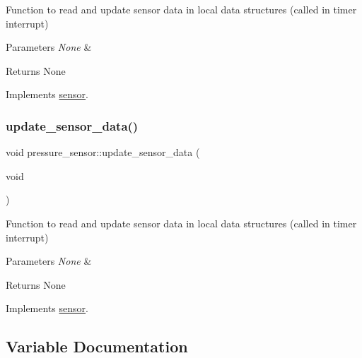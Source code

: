Function to read and update sensor data in local data structures (called in timer interrupt) 


\begin{DoxyParams}{Parameters}
{\em None} & \\
\hline
\end{DoxyParams}
\begin{DoxyReturn}{Returns}
None 
\end{DoxyReturn}


Implements \hyperlink{classsensor_a8a8cdbc1c82a4089bf0a70f980fb37d4}{sensor}.

\mbox{\label{group___ventilator_module_gac8d67444e99afbc866b1d759cbfde3c5}} 
\subsubsection{\texorpdfstring{update\+\_\+sensor\+\_\+data()}{update\_sensor\_data()}\hspace{0.1cm}{\footnotesize\ttfamily [2/2]}}
{\footnotesize\ttfamily void pressure\+\_\+sensor\+::update\+\_\+sensor\+\_\+data (\begin{DoxyParamCaption}\item[{void}]{ }\end{DoxyParamCaption})\hspace{0.3cm}{\ttfamily [virtual]}}



Function to read and update sensor data in local data structures (called in timer interrupt) 


\begin{DoxyParams}{Parameters}
{\em None} & \\
\hline
\end{DoxyParams}
\begin{DoxyReturn}{Returns}
None 
\end{DoxyReturn}


Implements \hyperlink{classsensor_a8a8cdbc1c82a4089bf0a70f980fb37d4}{sensor}.



\subsection{Variable Documentation}
\mbox{\label{group___ventilator_module_ga5986bfbbc6d7f88e4738a3d4b20b76f0}} 

